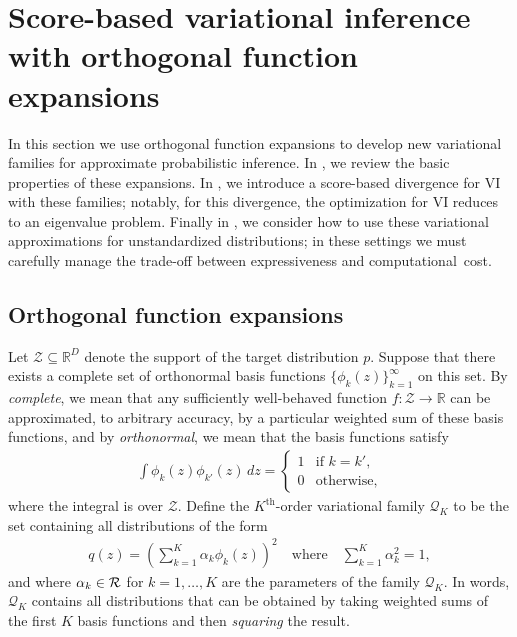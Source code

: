 
%


\section{Score-based variational inference with orthogonal function expansions}
\label{sec:scorebasedVI}

In this section we use orthogonal function expansions to develop new variational families for
approximate probabilistic inference. In , we review the basic properties of these
expansions.
In , we introduce a score-based divergence for VI with these families;
notably, for this divergence, the optimization for VI reduces to an eigenvalue
problem. Finally in ,
we consider how to use these variational approximations for unstandardized distributions;
in these settings we must carefully manage the trade-off between expressiveness and
computational~cost.


\subsection{Orthogonal function expansions}
\label{sec:orth}

Let $\mathcal{Z}\subseteq\mathbb{R}^D$ denote the support of the
target distribution $p$.
Suppose that there exists a
complete set of orthonormal basis functions
$\{\phi_k(z)\}_{k=1}^\infty$ on this set. By \emph{complete}, we mean
that any sufficiently well-behaved function
\mbox{$f:\mathcal{Z}\rightarrow\mathbb{R}$} can be approximated, to
arbitrary accuracy, by a particular weighted sum of these basis
functions, and by \emph{orthonormal}, we mean that the basis functions
satisfy
\begin{align}
\label{eq-orthonormal}
  \int\!\phi_k(z)\phi_{k'}(z)\, dz =
  \left\{
  \begin{array}{rr} 1 & \mbox{if $k=k'$}, \\
    0 & \mbox{otherwise,}\end{array}\right.
\end{align}
where the integral is over $\mathcal{Z}$.
Define the
$K^\text{th}$-order variational family $\mathcal{Q}_K$ to be the set containing
all distributions of the form
\begin{align}
  q(z) =  \left(\sum_{k=1}^{K} \alpha_k \phi_k(z)\right)^2\quad\mbox{where}\quad\sum_{k=1}^{K} \alpha_k^2=1,
\label{eq:OF-1}
\end{align}
and where $\alpha_k\in\mathcal{R}$ for $k=1,\ldots, K$ are the parameters of the family $\mathcal{Q}_K.$
In words,  $\mathcal{Q}_K$ contains all distributions that can be obtained by
taking weighted sums of the first $K$ basis functions and then \textit{squaring} the result.


